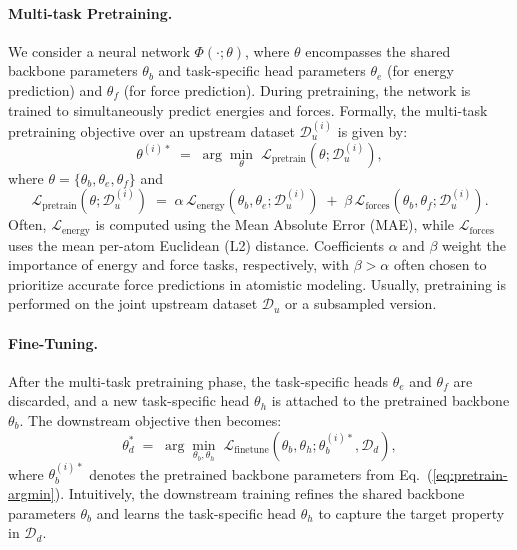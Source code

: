 \paragraph{Multi-task Pretraining.}  
We consider a neural network \(\Phi(\cdot; \theta)\), where \(\theta\) encompasses the shared backbone parameters \(\theta_b\) and task-specific head parameters \(\theta_e\) (for energy prediction) and \(\theta_f\) (for force prediction). During pretraining, the network is trained to simultaneously predict energies and forces. Formally, the multi-task pretraining objective over an upstream dataset \(\mathcal{D}_u^{(i)}\) is given by:
\begin{equation}
\theta^{(i)*} \;=\; \arg\min_{\theta} \;\mathcal{L}_{\text{pretrain}}(\theta; \mathcal{D}_{u}^{(i)}),
\label{eq:pretrain-argmin}
\end{equation}
where \(\theta = \{\theta_b, \theta_e, \theta_f\}\) and
\begin{equation}
\mathcal{L}_{\text{pretrain}}(\theta; \mathcal{D}_{u}^{(i)}) \;=\; 
\alpha \,\mathcal{L}_{\text{energy}}(\theta_b, \theta_e; \mathcal{D}_{u}^{(i)}) 
\;+\; 
\beta \,\mathcal{L}_{\text{forces}}(\theta_b, \theta_f; \mathcal{D}_{u}^{(i)}).
\label{eq:pretrain-loss}
\end{equation}
Often, \(\mathcal{L}_{\text{energy}}\) is computed using the Mean Absolute Error (MAE), while \(\mathcal{L}_{\text{forces}}\) uses the mean per-atom Euclidean (L2) distance. Coefficients \(\alpha\) and \(\beta\) weight the importance of energy and force tasks, respectively, with \(\beta > \alpha\) often chosen to prioritize accurate force predictions in atomistic modeling. Usually, pretraining is performed on the joint upstream dataset $\mathcal{D}_u$ or a subsampled version.

\paragraph{Fine-Tuning.}  
After the multi-task pretraining phase, the task-specific heads \(\theta_e\) and \(\theta_f\) are discarded, and a new task-specific head \(\theta_h\) is attached to the pretrained backbone \(\theta_b\). The downstream objective then becomes:
\begin{equation}
\theta_{d}^{*} \;=\; \arg\min_{\theta_b, \theta_h} \; \mathcal{L}_{\text{finetune}}(\theta_b, \theta_h; \theta_b^{(i)*}, \mathcal{D}_{d}),
\label{eq:finetune-argmin}
\end{equation}
where \(\theta_b^{(i)*}\) denotes the pretrained backbone parameters from Eq.~(\ref{eq:pretrain-argmin}).
Intuitively, the downstream training refines the shared backbone parameters \(\theta_b\) and learns the task-specific head \(\theta_h\) to capture the target property in \(\mathcal{D}_d\).


